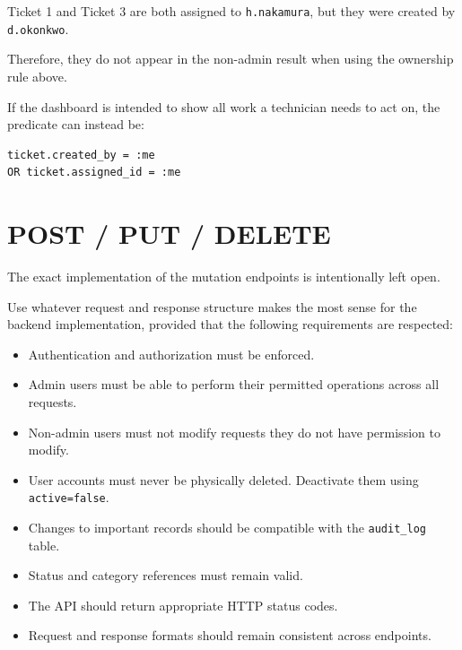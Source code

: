 \documentclass[11pt,a4paper]{article}
\begin{document}
Ticket 1 and Ticket 3 are both assigned to
\texttt{h.nakamura}, but they were created by
\texttt{d.okonkwo}.

Therefore, they do not appear in the non-admin result when
using the ownership rule above.

If the dashboard is intended to show all work a technician
needs to act on, the predicate can instead be:

\begin{lstlisting}[style=sql]
ticket.created_by = :me
OR ticket.assigned_id = :me
\end{lstlisting}


\clearpage
\section{POST / PUT / DELETE}

The exact implementation of the mutation endpoints is
intentionally left open.

Use whatever request and response structure makes the most
sense for the backend implementation, provided that the
following requirements are respected:

\begin{itemize}
    \item Authentication and authorization must be enforced.
    \item Admin users must be able to perform their permitted
          operations across all requests.
    \item Non-admin users must not modify requests they do not
          have permission to modify.
    \item User accounts must never be physically deleted.
          Deactivate them using \texttt{active=false}.
    \item Changes to important records should be compatible
          with the \texttt{audit\_log} table.
    \item Status and category references must remain valid.
    \item The API should return appropriate HTTP status codes.
    \item Request and response formats should remain
          consistent across endpoints.
\end{itemize}

\begin{center}
\end{center}
\end{document}
